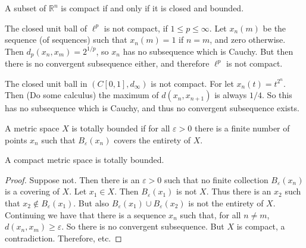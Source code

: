         \begin{theorem}
            A subset of
            $\mathbb{R}^{n}$ is
            compact if and only if
            it is closed and bounded.
        \end{theorem}
        \begin{example}
            The closed unit ball
            of $\ell^{p}$ is not compact,
            if $1\leq{p}\leq{\infty}$.
            Let $x_{n}(m)$ be the sequence
            (of sequences) such that
            $x_{n}(m)=1$ if $n=m$, and
            zero otherwise. Then
            $d_{p}(x_{n},x_{m})=2^{1/p}$,
            so $x_{n}$ has no subsequence
            which is Cauchy. But then there
            is no convergent subsequence
            either, and therefore
            $\ell^{p}$ is not compact.
        \end{example}
        \begin{example}
            The closed unit ball in
            $(C[0,1],d_{\infty})$ is
            not compact. For let
            $x_{n}(t)=t^{2^{n}}$. Then
            (Do some calculus) the maximum of
            $d(x_{n},x_{n+1})$ is always
            $1/4$. So this has no subsequence
            which is Cauchy, and thus no
            convergent subsequence exists.
        \end{example}
        \begin{definition}
            A metric space $X$ is totally
            bounded if for all
            $\varepsilon>0$ there is a finite
            number of points $x_{n}$ such
            that $B_{\varepsilon}(x_{n})$
            covers the entirety of $X$.
        \end{definition}
        \begin{theorem}
            A compact metric space is
            totally bounded.
        \end{theorem}
        \begin{proof}
            Suppose not. Then there is an
            $\varepsilon>0$ such that
            no finite collection
            $B_{\varepsilon}(x_{n})$
            is a covering of $X$. Let
            $x_{1}\in{X}$. Then
            $B_{\varepsilon}(x_{1})$ is not
            $X$. Thus there is an $x_{2}$
            such that
            $x_{2}\notin%
             B_{\varepsilon}(x_{1})$.
            But also
            $B_{\varepsilon}(x_{1})\cup%
             B_{\varepsilon}(x_{2})$ is
            not the entirety of $X$.
            Continuing we have that there
            is a sequence $x_{n}$ such that,
            for all $n\ne{m}$,
            $d(x_{n},x_{m})\geq{\varepsilon}$.
            So there is no convergent
            subsequence. But $X$ is
            compact, a contradiction.
            Therefore, etc.
        \end{proof}
